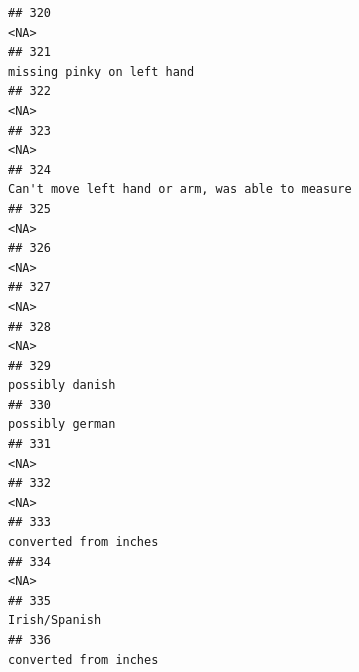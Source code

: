 \documentclass[]{article}
\begin{document}
\begin{verbatim}
## 320                                                                                                                                                <NA>
## 321                                                                                                                          missing pinky on left hand
## 322                                                                                                                                                <NA>
## 323                                                                                                                                                <NA>
## 324                                                                                                    Can't move left hand or arm, was able to measure
## 325                                                                                                                                                <NA>
## 326                                                                                                                                                <NA>
## 327                                                                                                                                                <NA>
## 328                                                                                                                                                <NA>
## 329                                                                                                                                     possibly danish
## 330                                                                                                                                     possibly german
## 331                                                                                                                                                <NA>
## 332                                                                                                                                                <NA>
## 333                                                                                                                               converted from inches
## 334                                                                                                                                                <NA>
## 335                                                                                                                                       Irish/Spanish
## 336                                                                                                                               converted from inches

\end{verbatim}
\end{document}
